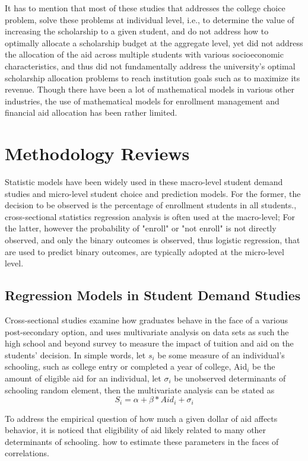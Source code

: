 \documentclass[12pt,english]{report}
\begin{document}
It has to mention that most of these studies that addresses the college choice problem, solve these problems at individual level, i.e., to determine the value of increasing the scholarship to a given student, and do not address how to optimally allocate a scholarship budget at the aggregate level, yet did not  address the allocation of the aid  across multiple students with various socioeconomic characteristics, and thus did not fundamentally address the university's optimal scholarship allocation problems to reach institution goals such as to maximize its revenue.  Though there have been a lot of mathematical models in various other industries, the use of mathematical models for enrollment management and financial aid allocation has been rather limited.

\section{Methodology Reviews}
Statistic models have been widely used in these macro-level student demand studies and micro-level student choice and prediction models.  For the former, the decision to be observed is the percentage of enrollment students in all students.,  cross-sectional statistics regression analysis is often used at the macro-level; For the latter, however the probability of "enroll" or "not enroll" is not directly observed, and only the binary outcomes is observed, thus logistic regression, that are used to predict binary outcomes, are typically adopted at the  micro-level level.

\subsection{Regression Models in Student Demand Studies}
Cross-sectional studies examine how graduates behave in the face of a various post-secondary option, and uses multivariate analysis on data sets as such the high school and beyond survey to measure the impact of tuition and aid on the students' decision.   In simple words, let $s_i$ be some measure of an individual's schooling, such as college entry or completed a year of college, Aid$_i$ be the amount of eligible aid for an individual,  let $\sigma_i$  be unobserved determinants of schooling random element, then the multivariate analysis can be stated as $$S_i = \alpha + \beta * Aid_i + \sigma_i$$

To address the empirical question of how much a given dollar of aid affects behavior,  it is noticed that eligibility of aid likely related to many other determinants of schooling.  \cite{Dynarski2002} how to estimate these parameters in the faces of correlations.
\end{document}
